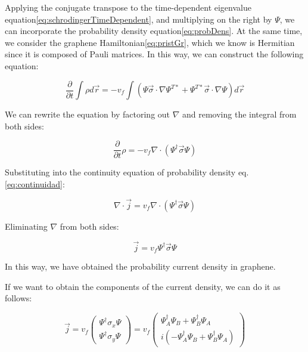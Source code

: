 Applying the conjugate transpose to the time-dependent eigenvalue equation\eqref{eq:schrodingerTimeDependent}, and multiplying on the right by $\Psi$, we can incorporate the probability density equation\eqref{eq:probDens}.
At the same time, we consider the graphene Hamiltonian\eqref{eq:pristGr}, which we know is Hermitian since it is composed of Pauli matrices.
In this way, we can construct the following equation:

\begin{equation}
    \label{eq:rho_sigma_nabla}
    \frac{\partial}{\partial t}\int\rho d\vec{r} = -v_f\int\left( \Psi\vec{\sigma}\cdot\nabla\Psi^{T*} + \Psi^{T*}\vec{\sigma}\cdot\nabla\Psi \right)d\vec{r}
\end{equation}

We can rewrite the equation by factoring out $\nabla$ and removing the integral from both sides:

\begin{equation}
    \label{eq:casi_j}
    \frac{\partial}{\partial t}\rho = -v_f\nabla\cdot\left( \Psi^\dagger \vec{\sigma} \Psi \right)
\end{equation}

Substituting into the continuity equation of probability density eq.\eqref{eq:continuidad}:

\begin{equation}
    \label{eq:nablaJ}
    \nabla\cdot\vec{j} = v_f\nabla\cdot\left( \Psi^\dagger \vec{\sigma} \Psi \right)
\end{equation}

Eliminating $\nabla$ from both sides:

\begin{equation}
    \label{eq:final}
    \vec{j} = v_f\Psi^\dagger \vec{\sigma} \Psi
\end{equation}

In this way, we have obtained the probability current density in graphene.

If we want to obtain the components of the current density, we can do it as follows:

\begin{equation}
    \label{eq:componentes}
    \vec{j} = v_f\begin{pmatrix}
                     \Psi^\dagger \sigma_x \Psi \\ \Psi^\dagger \sigma_y \Psi
    \end{pmatrix} = v_f\begin{pmatrix}
                           \Psi_A^\dagger\Psi_B + \Psi_B^\dagger\Psi_A \\ i(-\Psi_A^\dagger\Psi_B + \Psi_B^\dagger\Psi_A)
    \end{pmatrix}
\end{equation}

